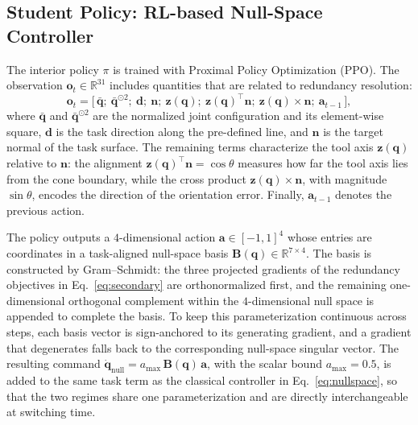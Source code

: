 \documentclass[journal, twoside]{IEEEtran}
\begin{document}
\subsection{Student Policy: RL-based Null-Space Controller}\label{sec:student}
The interior policy $\pi$ is trained with Proximal Policy Optimization (PPO). The observation $\mathbf{o}_{t}\in\mathbb{R}^{31}$ includes quantities that are related to redundancy resolution:
\begin{equation}
\label{eq:obs}
\mathbf{o}_{t}=\big[\,\bar{\mathbf{q}};\ \bar{\mathbf{q}}^{\odot 2};\ \mathbf{d};\ \mathbf{n};\ \mathbf{z}(\mathbf{q});\ \mathbf{z}(\mathbf{q})^{\top}\mathbf{n};\ \mathbf{z}(\mathbf{q})\times\mathbf{n};\ \mathbf{a}_{t-1}\,\big],
\end{equation}
where $\bar{\mathbf{q}}$ and $\bar{\mathbf{q}}^{\odot 2}$ are the normalized joint configuration and its element-wise square, $\mathbf{d}$ is the task direction along the pre-defined line, and $\mathbf{n}$ is the target normal of the task surface. The remaining terms characterize the tool axis $\mathbf{z}(\mathbf{q})$ relative to $\mathbf{n}$: the alignment $\mathbf{z}(\mathbf{q})^{\top}\mathbf{n}=\cos\theta$ measures how far the tool axis lies from the cone boundary, while the cross product $\mathbf{z}(\mathbf{q})\times\mathbf{n}$, with magnitude $\sin\theta$, encodes the direction of the orientation error. Finally, $\mathbf{a}_{t-1}$ denotes the previous action.

The policy outputs a $4$-dimensional action $\mathbf{a}\in[-1,1]^{4}$ whose entries are coordinates in a task-aligned null-space basis $\mathbf{B}(\mathbf{q})\in\mathbb{R}^{7\times 4}$. The basis is constructed by Gram--Schmidt: the three projected gradients of the redundancy objectives in Eq.~\eqref{eq:secondary} are orthonormalized first, and the remaining one-dimensional orthogonal complement within the $4$-dimensional null space is appended to complete the basis. To keep this parameterization continuous across steps, each basis vector is sign-anchored to its generating gradient, and a gradient that degenerates falls back to the corresponding null-space singular vector. The resulting command $\dot{\mathbf{q}}_{\mathrm{null}}=a_{\max}\,\mathbf{B}(\mathbf{q})\,\mathbf{a}$, with the scalar bound $a_{\max}=0.5$, is added to the same task term as the classical controller in Eq.~\eqref{eq:nullspace}, so that the two regimes share one parameterization and are directly interchangeable at switching time.
\end{document}
